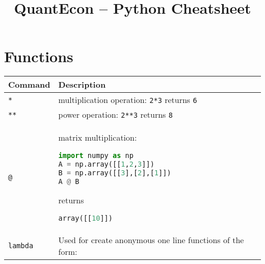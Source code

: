 \title{QuantEcon -- Python Cheatsheet}

\section{Functions}\label{functions}

\begin{tabular}[]{@{}ll@{}}
\toprule
\begin{minipage}[b]{0.17\columnwidth}\raggedright\strut
Command\strut
\end{minipage} & \begin{minipage}[b]{0.77\columnwidth}\raggedright\strut
Description\strut
\end{minipage}\tabularnewline
\midrule
\begin{minipage}[t]{0.17\columnwidth}\raggedright\strut
\lstinline!*!\strut
\end{minipage} & \begin{minipage}[t]{0.77\columnwidth}\raggedright\strut
multiplication operation: \lstinline!2*3! returns \lstinline!6!\strut
\end{minipage}\tabularnewline
\begin{minipage}[t]{0.17\columnwidth}\raggedright\strut
\lstinline!**!\strut
\end{minipage} & \begin{minipage}[t]{0.77\columnwidth}\raggedright\strut
power operation: \lstinline!2**3! returns \lstinline!8!\strut
\end{minipage}\tabularnewline
\begin{minipage}[t]{0.17\columnwidth}\raggedright\strut
\lstinline!@!\strut
\end{minipage} & \begin{minipage}[t]{0.77\columnwidth}\raggedright\strut
matrix multiplication:

\begin{lstlisting}[language=Python]
import numpy as np
A = np.array([[1,2,3]])
B = np.array([[3],[2],[1]])
A @ B
\end{lstlisting}

returns

\begin{lstlisting}[language=Python]
array([[10]])
\end{lstlisting}
\strut
\end{minipage}\tabularnewline
\begin{minipage}[t]{0.17\columnwidth}\raggedright\strut
\lstinline!lambda!\strut
\end{minipage} & \begin{minipage}[t]{0.77\columnwidth}\raggedright\strut
Used for create anonymous one line functions of the form:


\end{minipage}
\end{tabular}
